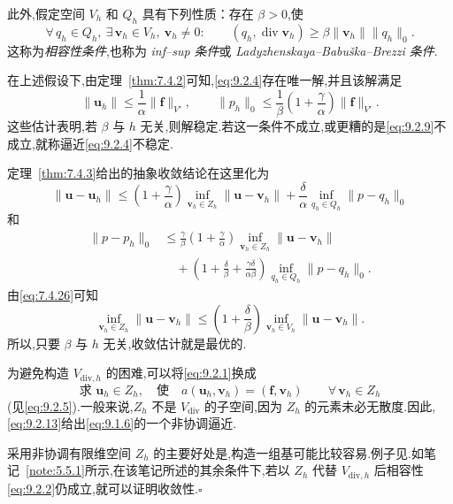 此外,假定空间 \(V_h\) 和 \(Q_h\) 具有下列性质：存在 \(\beta>0\),使
\begin{equation}\label{eq:9.2.9}
  \forall\,q_h\in Q_h,\ \exists\,\boldsymbol{v}_h\in V_h,\ \boldsymbol{v}_h\ne0:\qquad
      (q_h,\operatorname{div}\boldsymbol{v}_h)\ge\beta\|\boldsymbol{v}_h\|\|q_h\|_0.
\end{equation}
这称为\emph{相容性条件},也称为 \emph{inf--sup 条件}或 \emph{Ladyzhenskaya--Babuška--Brezzi 条件}.

在上述假设下,由定理~\ref{thm:7.4.2}可知,\eqref{eq:9.2.4}存在唯一解,并且该解满足
\begin{equation}\label{eq:9.2.10}
  \|\boldsymbol{u}_h\|\le\frac1\alpha\|\boldsymbol{f}\|_{V'},\qquad
  \|p_h\|_0\le\frac1\beta\left(1+\frac{\gamma}{\alpha}\right)\|\boldsymbol{f}\|_{V'}.
\end{equation}
这些估计表明,若 \(\beta\) 与 \(h\) 无关,则解稳定.若这一条件不成立,或更糟的是\eqref{eq:9.2.9}不成立,就称逼近\eqref{eq:9.2.4}不稳定.

定理~\ref{thm:7.4.3}给出的抽象收敛结论在这里化为
\begin{equation}\label{eq:9.2.11}
  \|\boldsymbol{u}-\boldsymbol{u}_h\|\le\left(1+\frac{\gamma}{\alpha}\right)
       \inf_{\boldsymbol{v}_h\in Z_h}\|\boldsymbol{u}-\boldsymbol{v}_h\|
       +\frac{\delta}{\alpha}\inf_{q_h\in Q_h}\|p-q_h\|_0
\end{equation}
和
\begin{equation}\label{eq:9.2.12}
  \begin{aligned}
    \|p-p_h\|_0&\le\frac{\gamma}{\beta}\left(1+\frac{\gamma}{\alpha}\right)
        \inf_{\boldsymbol{v}_h\in Z_h}\|\boldsymbol{u}-\boldsymbol{v}_h\|\\
       &\quad+\left(1+\frac{\delta}{\beta}+\frac{\gamma\delta}{\alpha\beta}\right)
         \inf_{q_h\in Q_h}\|p-q_h\|_0.
  \end{aligned}
\end{equation}
由\eqref{eq:7.4.26}可知
\[
  \inf_{\boldsymbol{v}_h\in Z_h}\|\boldsymbol{u}-\boldsymbol{v}_h\|
   \le\left(1+\frac{\delta}{\beta}\right)
         \inf_{\boldsymbol{v}_h\in V_h}\|\boldsymbol{u}-\boldsymbol{v}_h\|.
\]
所以,只要 \(\beta\) 与 \(h\) 无关,收敛估计就是最优的.

\begin{note}
为避免构造 \(V_{\mathrm{div},h}\) 的困难,可以将\eqref{eq:9.2.1}换成
\begin{equation}\label{eq:9.2.13}
  \text{求 }\boldsymbol{u}_h\in Z_h,\quad\text{使}\quad
  a(\boldsymbol{u}_h,\boldsymbol{v}_h)=(\boldsymbol{f},\boldsymbol{v}_h)\qquad\forall\,\boldsymbol{v}_h\in Z_h
\end{equation}
(见\eqref{eq:9.2.5}).一般来说,\(Z_h\) 不是 \(V_{\mathrm{div}}\) 的子空间,因为 \(Z_h\) 的元素未必无散度.因此,\eqref{eq:9.2.13}给出\eqref{eq:9.1.6}的一个{\heiti 非协调逼近}.

采用非协调有限维空间 \(Z_h\) 的主要好处是,构造一组基可能比较容易.例子见.如笔记~\ref{note:5.5.1}所示,在该笔记所述的其余条件下,若以 \(Z_h\) 代替 \(V_{\mathrm{div},h}\) 后相容性\eqref{eq:9.2.2}仍成立,就可以证明收敛性.\hfill\(\square\)
\end{note}

